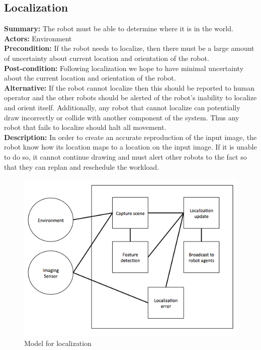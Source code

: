 \subsection{Localization}
\textbf{Summary:} The robot must be able to determine where it is in the world. \\
\textbf{Actors:} Environment \\
\textbf{Precondition:} If the robot needs to localize, then there must be a large amount of uncertainty about current location and orientation of the robot. \\
\textbf{Post-condition:} Following localization we hope to have minimal uncertainty about the current location and orientation of the robot. \\
\textbf{Alternative:} If the robot cannot localize then this should be reported to human operator and the other robots should be alerted of the robot's inability to localize and orient itself. Additionally, any robot that cannot localize can potentially draw incorrectly or collide with another component of the system. Thus any robot that fails to localize should halt all movement. \\
\textbf{Description:} In order to create an accurate reproduction of the input image, the robot know how its location maps to a location on the input image. If it is unable to do so, it cannot continue drawing and must alert other robots to the fact so that they can replan and reschedule the workload. \\

\begin{figure}
 \centering
  \includegraphics[width=0.48\columnwidth]{figs/use_case-localization.jpg}
\caption{Model for localization}
 \label{fig:localize}
\end{figure}

